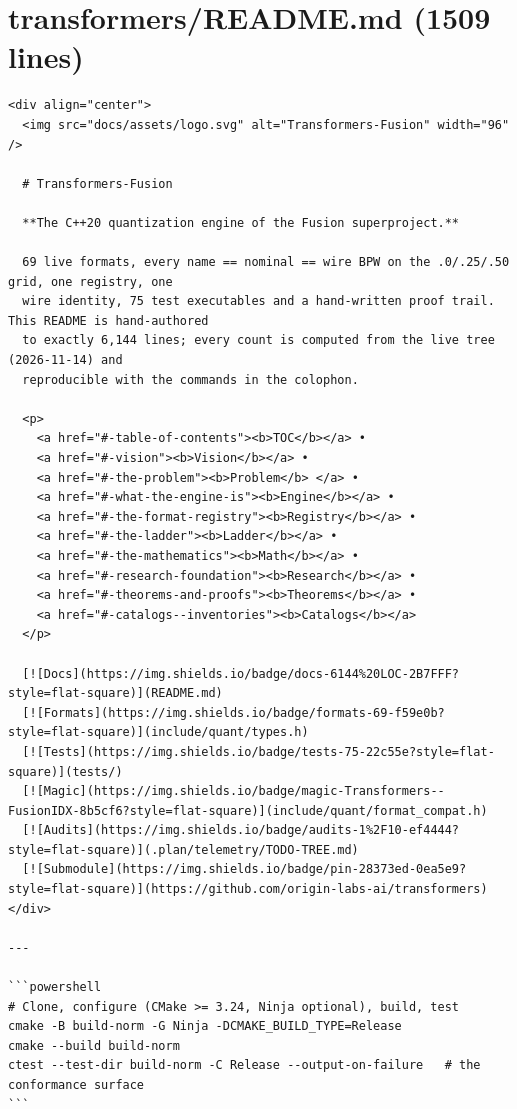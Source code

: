 \section*{transformers/README.md (1509 lines)}
\begingroup\begin{Verbatim}[breaklines,breakanywhere,fontsize=\footnotesize]
<div align="center">
  <img src="docs/assets/logo.svg" alt="Transformers-Fusion" width="96" />

  # Transformers-Fusion

  **The C++20 quantization engine of the Fusion superproject.**

  69 live formats, every name == nominal == wire BPW on the .0/.25/.50 grid, one registry, one
  wire identity, 75 test executables and a hand-written proof trail. This README is hand-authored
  to exactly 6,144 lines; every count is computed from the live tree (2026-11-14) and
  reproducible with the commands in the colophon.

  <p>
    <a href="#-table-of-contents"><b>TOC</b></a> •
    <a href="#-vision"><b>Vision</b></a> •
    <a href="#-the-problem"><b>Problem</b> </a> •
    <a href="#-what-the-engine-is"><b>Engine</b></a> •
    <a href="#-the-format-registry"><b>Registry</b></a> •
    <a href="#-the-ladder"><b>Ladder</b></a> •
    <a href="#-the-mathematics"><b>Math</b></a> •
    <a href="#-research-foundation"><b>Research</b></a> •
    <a href="#-theorems-and-proofs"><b>Theorems</b></a> •
    <a href="#-catalogs--inventories"><b>Catalogs</b></a>
  </p>

  [![Docs](https://img.shields.io/badge/docs-6144%20LOC-2B7FFF?style=flat-square)](README.md)
  [![Formats](https://img.shields.io/badge/formats-69-f59e0b?style=flat-square)](include/quant/types.h)
  [![Tests](https://img.shields.io/badge/tests-75-22c55e?style=flat-square)](tests/)
  [![Magic](https://img.shields.io/badge/magic-Transformers--FusionIDX-8b5cf6?style=flat-square)](include/quant/format_compat.h)
  [![Audits](https://img.shields.io/badge/audits-1%2F10-ef4444?style=flat-square)](.plan/telemetry/TODO-TREE.md)
  [![Submodule](https://img.shields.io/badge/pin-28373ed-0ea5e9?style=flat-square)](https://github.com/origin-labs-ai/transformers)
</div>

---

```powershell
# Clone, configure (CMake >= 3.24, Ninja optional), build, test
cmake -B build-norm -G Ninja -DCMAKE_BUILD_TYPE=Release
cmake --build build-norm
ctest --test-dir build-norm -C Release --output-on-failure   # the conformance surface
```


\end{Verbatim}
